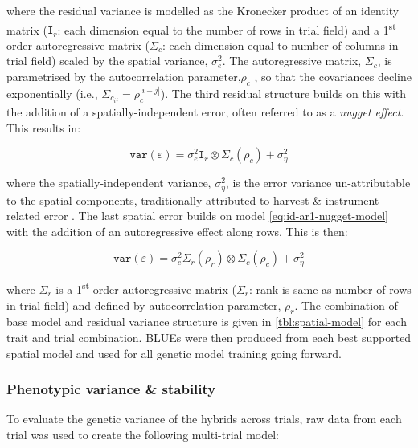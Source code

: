 where the residual variance is modelled as the Kronecker product of an identity matrix (\(\mathtt I_r\): each dimension equal to the number of rows in trial field) and a 1\textsuperscript{st} order autoregressive matrix (\(\mathtt \Sigma_c\): each dimension equal to number of columns in trial field) scaled by the spatial variance, \(\sigma^2_e\). The autoregressive matrix, \(\Sigma_c\), is parametrised by the autocorrelation parameter,\(\rho_c\) , so that the covariances decline exponentially (i.e., \(\Sigma_{c_{ij}} = \rho_c^{|i - j|}\)). The third residual structure builds on this with the addition of a spatially-independent error, often referred to as a \emph{nugget effect}. This results in:

\begin{equation}
\mathtt{var}(\varepsilon) = \sigma^2_e \mathtt I_r\otimes\Sigma_c(\rho_c) + \sigma^2_{\eta} \label{eq:id-ar1-nugget-model}
\end{equation}

where the spatially-independent variance, \(\sigma^2_{\eta}\), is the error variance un-attributable to the spatial components, traditionally attributed to harvest \& instrument related error \parencite{Muller2010}. The last spatial error builds on model \eqref{eq:id-ar1-nugget-model} with the addition of an autoregressive effect along rows. This is then:

\begin{equation}
\mathtt{var}(\varepsilon) = \sigma^2_e\Sigma_r(\rho_r)\otimes\Sigma_c(\rho_c) + \sigma^2_{\eta}   
\label{eq:ar1-ar1-nugget-model}
\end{equation}

where \(\Sigma_r\) is a 1\textsuperscript{st} order autoregressive matrix (\(\mathtt \Sigma_r\): rank is same as number of rows in trial field) and defined by autocorrelation parameter, \(\rho_r\). The combination of base model and residual variance structure is given in \ref{tbl:spatial-model} for each trait and trial combination. BLUEs were then produced from each best supported spatial model and used for all genetic model training going forward.

\subsubsection{Phenotypic variance \& stability}

To evaluate the genetic variance of the hybrids across trials, raw data from each trial was used to create the following multi-trial model:

